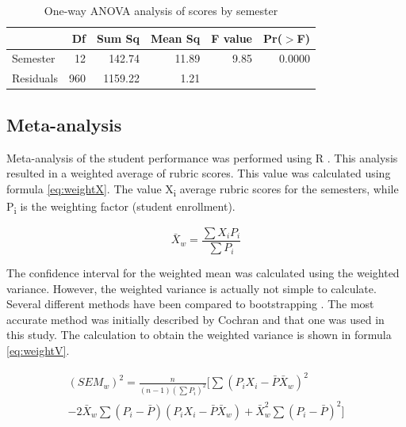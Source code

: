 \documentclass[fleqn,10pt]{SelfArx}\usepackage[]{graphicx}\usepackage[]{color}
\begin{document}
\begin{center}
\begin{table}[ht]
\centering
\caption{One-way ANOVA analysis of scores by semester} 
\label{tab:anova}
\begin{tabular}{lrrrrr}
  \hline
 & Df & Sum Sq & Mean Sq & F value & Pr($>$F) \\ 
  \hline
Semester & 12 & 142.74 & 11.89 & 9.85 & 0.0000 \\ 
  Residuals & 960 & 1159.22 & 1.21 &  &  \\ 
   \hline
\end{tabular}
\end{table}

\end{center}

\subsection{Meta-analysis}
Meta-analysis of the student performance was performed using R \citep{TQMP11-1-37}. This analysis resulted in a weighted average of rubric scores. This value was calculated using formula \ref{eq:weightX}. The value X\textsubscript{i} average rubric scores for the semesters, while P\textsubscript{i} is the weighting factor (student enrollment).

\begin{equation}
\bar{X}_w = \frac{\sum X_i P_i}{\sum P_i}
\label{eq:weightX}
\end{equation}

The confidence interval for the weighted mean was calculated using the weighted variance. However, the weighted variance is actually not simple to calculate. Several different methods have been compared to bootstrapping \citep{Gatz1995a}. The most accurate method was initially described by Cochran \citep{Cochran1977} and that one was used in this study. The calculation to obtain the weighted variance is shown in formula \ref{eq:weightV}.

\begin{equation}
\begin{split}
(SEM_w)^2 = \frac{n}{(n-1)(\sum P_i)^2}\big[ \sum(P_i X_i - \bar{P}\bar{X}_w)^2 \\
- 2\bar{X}_w \sum(P_i - \bar{P})(P_i X_ i - \bar{P} \bar{X}_w) + \bar{X}_w^2 \sum(P_i - \bar{P})^2 \big]
\label{eq:weightV}
\end{split}
\end{equation}
\end{document}

